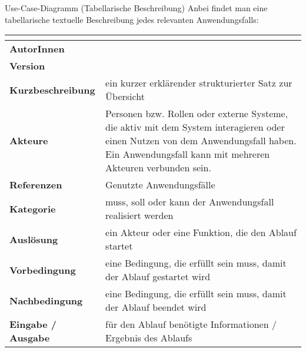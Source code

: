 \begin{diag}{Use-Case-Diagramm (Tabellarische Beschreibung)}
    Anbei findet man eine tabellarische textuelle Beschreibung jedes relevanten Anwendungsfalls:

    \begin{tabularx}{\textwidth}{|>{\bfseries}l|X|}
        \hline
        \multicolumn{2}{|l|}{Use-Case-Nummer, Use-Case-Name}                                                                                                   \\\hline\hline
        AutorInnen          &                                                                                                                                  \\\hline
        Version             &                                                                                                                                  \\\hline
        Kurzbeschreibung    & ein kurzer erklärender strukturierter Satz zur Übersicht                                                                         \\\hline
        Akteure             & Personen bzw. Rollen oder externe Systeme, die aktiv mit dem System interagieren oder einen Nutzen von dem Anwendungsfall haben.
        Ein Anwendungsfall kann mit mehreren Akteuren verbunden sein.                                                                                          \\\hline
        Referenzen          & Genutzte Anwendungsfälle                                                                                                         \\\hline
        Kategorie           & muss, soll oder kann der Anwendungsfall realisiert werden                                                                        \\\hline
        Auslösung           & ein Akteur oder eine Funktion, die den Ablauf startet                                                                            \\\hline
        Vorbedingung        & eine Bedingung, die erfüllt sein muss, damit der Ablauf gestartet wird                                                           \\\hline
        Nachbedingung       & eine Bedingung, die erfüllt sein muss, damit der Ablauf beendet wird                                                             \\\hline
        Eingabe / Ausgabe   & für den Ablauf benötigte Informationen / Ergebnis des Ablaufs                                                                    \\\hline

\end{tabularx}
\end{diag}
